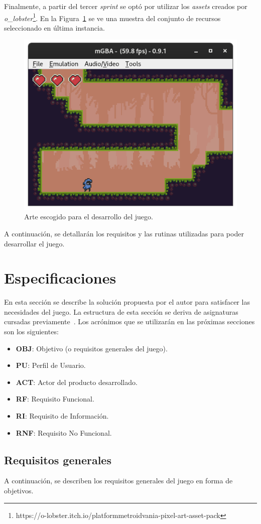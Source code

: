 Finalmente, a partir del tercer \textit{sprint} se optó por utilizar los \textit{assets} creados por \textit{o\_lobster}\footnote{https://o-lobster.itch.io/platformmetroidvania-pixel-art-asset-pack}. En la Figura~\ref{fig:proto_3} se ve una muestra del conjunto de recursos seleccionado en última instancia.

\begin{figure}[h]
	\centering
	\includegraphics[width=.5\textwidth]{capitulos/capitulo5/preview_lobster.png}
	\caption{Arte escogido para el desarrollo del juego.}\label{fig:proto_3}
\end{figure}
\FloatBarrier{}

A continuación, se detallarán los requisitos y las rutinas utilizadas para poder desarrollar el juego.

\section{Especificaciones}
En esta sección se describe la solución propuesta por el autor para satisfacer las necesidades del juego. La estructura de esta sección se deriva de asignaturas cursadas previamente~\cite{bib:diu}. Los acrónimos que se utilizarán en las próximas secciones son los siguientes:

\begin{itemize}
	\item \textbf{OBJ}: Objetivo (o requisitos generales del juego).
	\item \textbf{PU}: Perfil de Usuario.
	\item \textbf{ACT}: Actor del producto desarrollado.
	\item \textbf{RF}: Requisito Funcional.
	\item \textbf{RI}: Requisito de Información.
	\item \textbf{RNF}: Requisito No Funcional.
\end{itemize}

\subsection{Requisitos generales}
A continuación, se describen los requisitos generales del juego en forma de objetivos.

